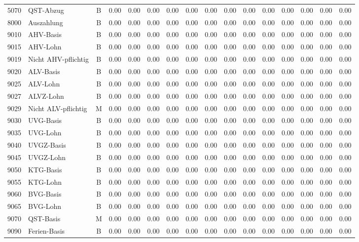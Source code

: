 \documentclass[8pt,a4paper]{extarticle}
\begin{document}
\begin{longtable}{@{\extracolsep{\fill}} l l c r r r r r r r r r r r r r}
5070&QST-Abzug&B&0.00&0.00&0.00&0.00&0.00&0.00&0.00&0.00&0.00&0.00&0.00&0.00&0.00\\
8000&Auszahlung&B&0.00&0.00&0.00&0.00&0.00&0.00&0.00&0.00&0.00&0.00&0.00&0.00&0.00\\
9010&AHV-Basis&B&0.00&0.00&0.00&0.00&0.00&0.00&0.00&0.00&0.00&0.00&0.00&0.00&0.00\\
9015&AHV-Lohn&B&0.00&0.00&0.00&0.00&0.00&0.00&0.00&0.00&0.00&0.00&0.00&0.00&0.00\\
9019&Nicht AHV-pflichtig&B&0.00&0.00&0.00&0.00&0.00&0.00&0.00&0.00&0.00&0.00&0.00&0.00&0.00\\
9020&ALV-Basis&B&0.00&0.00&0.00&0.00&0.00&0.00&0.00&0.00&0.00&0.00&0.00&0.00&0.00\\
9025&ALV-Lohn&B&0.00&0.00&0.00&0.00&0.00&0.00&0.00&0.00&0.00&0.00&0.00&0.00&0.00\\
9027&ALVZ-Lohn&B&0.00&0.00&0.00&0.00&0.00&0.00&0.00&0.00&0.00&0.00&0.00&0.00&0.00\\
9029&Nicht ALV-pflichtig&M&0.00&0.00&0.00&0.00&0.00&0.00&0.00&0.00&0.00&0.00&0.00&0.00&0.00\\
9030&UVG-Basis&B&0.00&0.00&0.00&0.00&0.00&0.00&0.00&0.00&0.00&0.00&0.00&0.00&0.00\\
9035&UVG-Lohn&B&0.00&0.00&0.00&0.00&0.00&0.00&0.00&0.00&0.00&0.00&0.00&0.00&0.00\\
9040&UVGZ-Basis&B&0.00&0.00&0.00&0.00&0.00&0.00&0.00&0.00&0.00&0.00&0.00&0.00&0.00\\
9045&UVGZ-Lohn&B&0.00&0.00&0.00&0.00&0.00&0.00&0.00&0.00&0.00&0.00&0.00&0.00&0.00\\
9050&KTG-Basis&B&0.00&0.00&0.00&0.00&0.00&0.00&0.00&0.00&0.00&0.00&0.00&0.00&0.00\\
9055&KTG-Lohn&B&0.00&0.00&0.00&0.00&0.00&0.00&0.00&0.00&0.00&0.00&0.00&0.00&0.00\\
9060&BVG-Basis&B&0.00&0.00&0.00&0.00&0.00&0.00&0.00&0.00&0.00&0.00&0.00&0.00&0.00\\
9065&BVG-Lohn&B&0.00&0.00&0.00&0.00&0.00&0.00&0.00&0.00&0.00&0.00&0.00&0.00&0.00\\
9070&QST-Basis&M&0.00&0.00&0.00&0.00&0.00&0.00&0.00&0.00&0.00&0.00&0.00&0.00&0.00\\
9090&Ferien-Basis&B&0.00&0.00&0.00&0.00&0.00&0.00&0.00&0.00&0.00&0.00&0.00&0.00&0.00\\

\end{longtable}
\pagebreak
\end{document}
